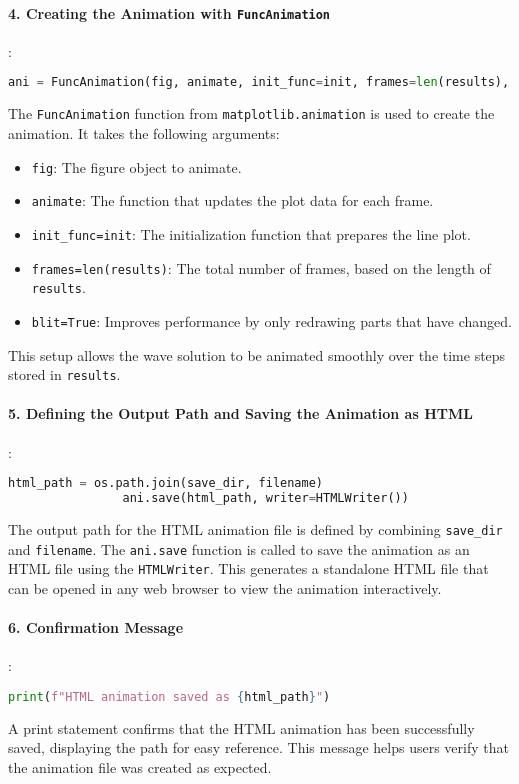 \documentclass{article}
\begin{document}
			\paragraph{4. Creating the Animation with \texttt{FuncAnimation}}
			:
			\begin{lstlisting}[language=Python]
				ani = FuncAnimation(fig, animate, init_func=init, frames=len(results), blit=True)
			\end{lstlisting}
			The \texttt{FuncAnimation} function from \texttt{matplotlib.animation} is used to create the animation. It takes the following arguments:
			\begin{itemize}
				\item \texttt{fig}: The figure object to animate.
				\item \texttt{animate}: The function that updates the plot data for each frame.
				\item \texttt{init\_func=init}: The initialization function that prepares the line plot.
				\item \texttt{frames=len(results)}: The total number of frames, based on the length of \texttt{results}.
				\item \texttt{blit=True}: Improves performance by only redrawing parts that have changed.
			\end{itemize}
			This setup allows the wave solution to be animated smoothly over the time steps stored in \texttt{results}.
			
			\paragraph{5. Defining the Output Path and Saving the Animation as HTML}
			:
			\begin{lstlisting}[language=Python]
				html_path = os.path.join(save_dir, filename)
				ani.save(html_path, writer=HTMLWriter())
			\end{lstlisting}
			The output path for the HTML animation file is defined by combining \texttt{save\_dir} and \texttt{filename}. The \texttt{ani.save} function is called to save the animation as an HTML file using the \texttt{HTMLWriter}. This generates a standalone HTML file that can be opened in any web browser to view the animation interactively.
			
			\paragraph{6. Confirmation Message}
			:
			\begin{lstlisting}[language=Python]
				print(f"HTML animation saved as {html_path}")
			\end{lstlisting}
			A print statement confirms that the HTML animation has been successfully saved, displaying the path for easy reference. This message helps users verify that the animation file was created as expected.
			
\end{document}
